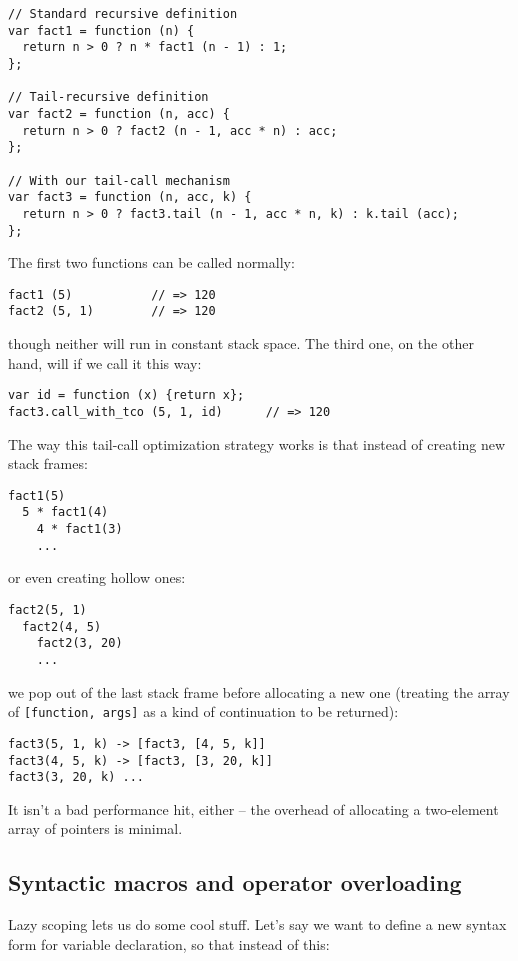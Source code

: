 \documentclass{article}
\begin{document}
\begin{verbatim}
// Standard recursive definition
var fact1 = function (n) {
  return n > 0 ? n * fact1 (n - 1) : 1;
};

// Tail-recursive definition
var fact2 = function (n, acc) {
  return n > 0 ? fact2 (n - 1, acc * n) : acc;
};

// With our tail-call mechanism
var fact3 = function (n, acc, k) {
  return n > 0 ? fact3.tail (n - 1, acc * n, k) : k.tail (acc);
};
\end{verbatim}

    The first two functions can be called normally:

\begin{verbatim}
fact1 (5)           // => 120
fact2 (5, 1)        // => 120
\end{verbatim}

    \noindent though neither will run in constant stack space. The third one, on the other hand, will if we call it this way:

\begin{verbatim}
var id = function (x) {return x};
fact3.call_with_tco (5, 1, id)      // => 120
\end{verbatim}

    The way this tail-call optimization strategy works is that instead of creating new stack frames:

\begin{verbatim}
fact1(5)
  5 * fact1(4)
    4 * fact1(3)
    ...
\end{verbatim}

    \noindent or even creating hollow ones:

\begin{verbatim}
fact2(5, 1)
  fact2(4, 5)
    fact2(3, 20)
    ...
\end{verbatim}

    \noindent we pop out of the last stack frame before allocating a new one (treating the array of \verb|[function, args]| as a kind of continuation to be returned):

\begin{verbatim}
fact3(5, 1, k) -> [fact3, [4, 5, k]]
fact3(4, 5, k) -> [fact3, [3, 20, k]]
fact3(3, 20, k) ...
\end{verbatim}

    It isn't a bad performance hit, either -- the overhead of allocating a two-element array of pointers is minimal.

\subsection {Syntactic macros and operator overloading}
    Lazy scoping lets us do some cool stuff. Let's say we want to define a new syntax form for variable declaration, so that instead of this:
\end{document}

